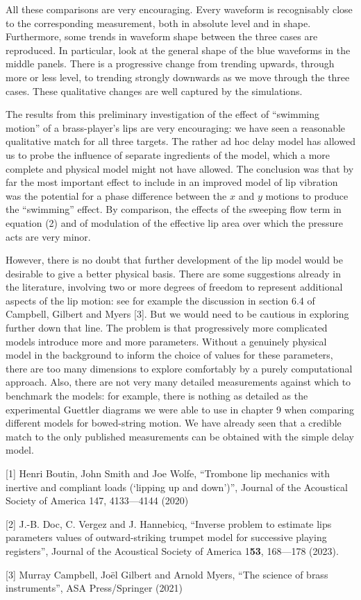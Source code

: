  All these comparisons are very encouraging. Every waveform is recognisably 
  close to the corresponding measurement, both in absolute level and in shape. 
  Furthermore, some trends in waveform shape between the three cases are 
  reproduced. In particular, look at the general shape of the blue waveforms in 
  the middle panels. There is a progressive change from trending upwards, 
  through more or less level, to trending strongly downwards as we move through 
  the three cases. These qualitative changes are well captured by the 
  simulations. 

  The results from this preliminary investigation of the effect of ``swimming 
  motion'' of a brass-player's lips are very encouraging: we have seen a 
  reasonable qualitative match for all three targets. The rather ad hoc delay 
  model has allowed us to probe the influence of separate ingredients of the 
  model, which a more complete and physical model might not have allowed. The 
  conclusion was that by far the most important effect to include in an 
  improved model of lip vibration was the potential for a phase difference 
  between the $x$ and $y$ motions to produce the ``swimming'' effect. By 
  comparison, the effects of the sweeping flow term in equation (2) and of 
  modulation of the effective lip area over which the pressure acts are very 
  minor. 

  However, there is no doubt that further development of the lip model would be 
  desirable to give a better physical basis. There are some suggestions already 
  in the literature, involving two or more degrees of freedom to represent 
  additional aspects of the lip motion: see for example the discussion in 
  section 6.4 of Campbell, Gilbert and Myers [3]. But we would need to be 
  cautious in exploring further down that line. The problem is that 
  progressively more complicated models introduce more and more parameters. 
  Without a genuinely physical model in the background to inform the choice of 
  values for these parameters, there are too many dimensions to explore 
  comfortably by a purely computational approach. Also, there are not very many 
  detailed measurements against which to benchmark the models: for example, 
  there is nothing as detailed as the experimental Guettler diagrams we were 
  able to use in chapter 9 when comparing different models for bowed-string 
  motion. We have already seen that a credible match to the only published 
  measurements can be obtained with the simple delay model. 

  \sectionreferences{}[1] Henri Boutin, John Smith and Joe Wolfe, “Trombone lip 
  mechanics with inertive and compliant loads (‘lipping up and down’)”, Journal 
  of the Acoustical Society of America 147, 4133—4144 (2020) 

  [2] J.-B. Doc, C. Vergez and J. Hannebicq, “Inverse problem to estimate lips 
  parameters values of outward-striking trumpet model for successive playing 
  registers”, Journal of the Acoustical Society of America 1\textbf{53}, 
  168—178 (2023). 

  [3] Murray Campbell, Joël Gilbert and Arnold Myers, “The science of brass 
  instruments”, ASA Press/Springer (2021) 